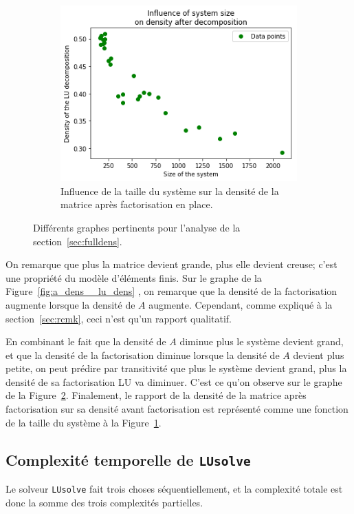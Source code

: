 \documentclass[11pt]{article}
\begin{document}
\begin{figure}[H]
\begin{subfigure}[t]{0.32\textwidth}
		\label{fig:dens_ratio}
	\end{subfigure}\hfill
	\begin{subfigure}[t]{0.32\textwidth}
		\centering
		\includegraphics[width=\linewidth]{dens_lu__size.png}
		\caption{Influence de la taille du système sur la densité de la matrice après factorisation en place.}
		\label{fig:dens_lu__size}
	\end{subfigure}
	\caption{Différents graphes pertinents pour l'analyse de la section~\ref{sec:fulldens}.}
	\label{fig:full_density}
\end{figure}
On remarque que plus la matrice devient grande, plus elle devient creuse; c'est une propriété du modèle d'éléments finis. Sur le graphe de la Figure~\ref{fig:a_dens__lu_dens} , on remarque que la densité de la factorisation augmente lorsque la densité de $A$ augmente. Cependant, comme expliqué à la section~\ref{sec:rcmk}, ceci n'est qu'un rapport qualitatif.

En combinant le fait que la densité de $A$ diminue plus le système devient grand, et que la densité de la factorisation diminue lorsque la densité de $A$ devient plus petite, on peut prédire par transitivité que plus le système devient grand, plus la densité de sa factorisation LU va diminuer.
C'est ce qu'on observe sur le graphe de la Figure~\ref{fig:dens_lu__size}.
Finalement, le rapport de la densité de la matrice après factorisation sur sa densité avant factorisation est représenté comme une fonction de la taille du système à la Figure~\ref{fig:dens_ratio}.

\subsection{Complexité temporelle de \texttt{LUsolve}}
Le solveur \lstinline|LUsolve| fait trois choses séquentiellement, et la complexité totale est donc la somme des trois complexités partielles.
\end{document}
